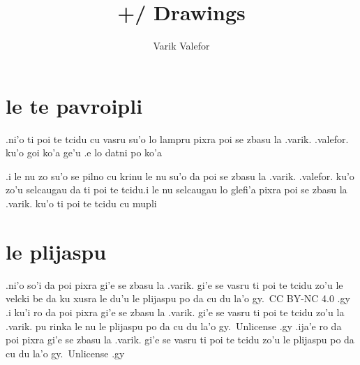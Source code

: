 \documentclass{report}
\title{+/ Drawings}
\author{Varik Valefor}
\begin{document}
\maketitle{}
\tableofcontents{}
\chapter{le te pavroipli}
.ni'o ti poi te tcidu cu vasru su'o lo lampru pixra poi se zbasu la .varik. .valefor. ku'o goi ko'a ge'u .e lo datni po ko'a

.i le nu zo su'o se pilno cu krinu le nu su'o da poi se zbasu la .varik. .valefor. ku'o zo'u selcaugau da ti poi te tcidu\@  .i le nu selcaugau lo glefi'a pixra poi se zbasu la .varik. ku'o ti poi te tcidu cu mupli

\chapter{le plijaspu}
.ni'o so'i da poi pixra gi'e se zbasu la .varik. gi'e se vasru ti poi te tcidu zo'u le velcki be da ku xusra le du'u le plijaspu po da cu du la'o gy.\ CC BY-NC 4.0 .gy  .i ku'i ro da poi pixra gi'e se zbasu la .varik. gi'e se vasru ti poi te tcidu zo'u la .varik. pu rinka le nu le plijaspu po da cu du la'o gy.\ Unlicense .gy  .ija'e ro da poi pixra gi'e se zbasu la .varik. gi'e se vasru ti poi te tcidu zo'u le plijaspu po da cu du la'o gy.\ Unlicense .gy
\end{document}
